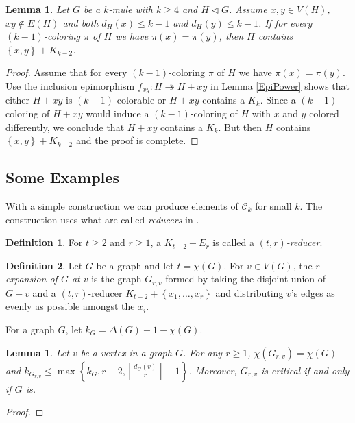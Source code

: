\documentclass[12pt]{article}
\theoremstyle{plain}
\newtheorem{lem}[thm]{Lemma}
\theoremstyle{definition}
\newtheorem{defn}{Definition}[section]
\theoremstyle{remark}
\newcommand{\fancy}[1]{\mathcal{#1}}
\newcommand{\C}[1]{\fancy{C}_{#1}}
\newcommand{\surj}{\twoheadrightarrow}
\newcommand{\set}[1]{\left\{ #1 \right\}}
\newcommand{\ceil}[1]{\left\lceil#1\right\rceil}
\begin{document}
\begin{lem}\label{UnequalColoredPairOrCliqueMinusEdge}
Let $G$ be a $k$-mule with $k \geq 4$ and $H \lhd G$.  Assume $x, y \in V(H)$, $xy \not \in E(H)$ and both $d_H(x) \leq k-1$ and $d_H(y) \leq k-1$. If for every $(k-1)$-coloring $\pi$ of $H$ we have $\pi(x) = \pi(y)$, then $H$ contains $\set{x, y} + K_{k-2}$.
\end{lem}
\begin{proof}
Assume that for every $(k-1)$-coloring $\pi$ of $H$ we have $\pi(x) = \pi(y)$.
Use the inclusion epimorphism $f_{xy}\colon H \surj H + xy$ in Lemma \ref{EpiPower} shows that either $H + xy$ is $(k-1)$-colorable or $H + xy$ contains a $K_k$.  Since a $(k-1)$-coloring of $H + xy$ would induce a $(k-1)$-coloring of $H$ with $x$ and $y$ colored differently, we conclude that $H + xy$ contains a $K_k$.  But then $H$ contains $\set{x, y} + K_{k-2}$ and the proof is complete.
\end{proof}


\subsection{Some Examples}
With a simple construction we can produce elements of $\C{k}$ for small $k$.  The construction uses what are called \emph{reducers} in \cite{molloy2002graph}.

\begin{defn}
For $t \geq 2$ and $r \geq 1$, a $K_{t-2} + E_r$ is called a \emph{$(t, r)$-reducer}.
\end{defn}

\begin{defn}
Let $G$ be a graph and let $t = \chi(G)$.  For $v \in V(G)$, the \emph{$r$-expansion of $G$ at $v$} is the graph $G_{r, v}$ formed by taking the disjoint union of $G - v$ and a $(t, r)$-reducer $K_{t - 2} + \set{x_1, \ldots, x_r}$ and distributing $v$'s edges as evenly as possible amongst the $x_i$.
\end{defn}

For a graph $G$, let $k_G = \Delta(G) + 1 - \chi(G)$.

\begin{lem}\label{ReducerLemma}
Let $v$ be a vertex in a graph $G$.  For any $r \geq 1$, $\chi(G_{r, v}) = \chi(G)$ and $k_{G_{r, v}} \leq\max\set{k_G, r - 2, \ceil{\frac{d_G(v)}{r}} - 1}$.  Moreover, $G_{r, v}$ is critical if and only if $G$ is.
\end{lem}
\begin{proof}
\end{proof}
\end{document}
